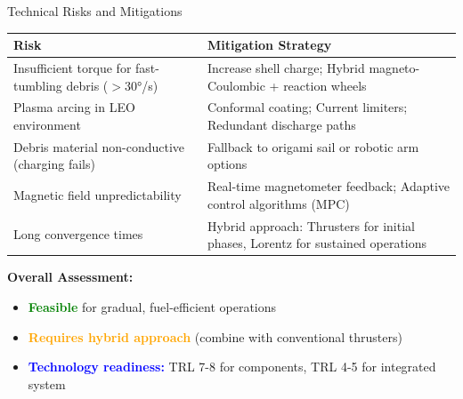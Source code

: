 \documentclass[aspectratio=169]{beamer}
\begin{document}
\begin{frame}{Technical Risks and Mitigations}
\begin{center}
\begin{tabular}{p{5cm}p{6cm}}
\toprule
\textbf{Risk} & \textbf{Mitigation Strategy} \\
\midrule
Insufficient torque for fast-tumbling debris ($>30°$/s) & Increase shell charge; Hybrid magneto-Coulombic + reaction wheels \\
\midrule
Plasma arcing in LEO environment & Conformal coating; Current limiters; Redundant discharge paths \\
\midrule
Debris material non-conductive (charging fails) & Fallback to origami sail or robotic arm options \\
\midrule
Magnetic field unpredictability & Real-time magnetometer feedback; Adaptive control algorithms (MPC) \\
\midrule
Long convergence times & Hybrid approach: Thrusters for initial phases, Lorentz for sustained operations \\
\bottomrule
\end{tabular}
\end{center}

\vspace{0.3cm}
\textbf{Overall Assessment:}
\begin{itemize}
    \item \textcolor{green}{\textbf{Feasible}} for gradual, fuel-efficient operations
    \item \textcolor{orange}{\textbf{Requires hybrid approach}} (combine with conventional thrusters)
    \item \textcolor{blue}{\textbf{Technology readiness:}} TRL 7-8 for components, TRL 4-5 for integrated system
\end{itemize}
\end{frame}
\end{document}
